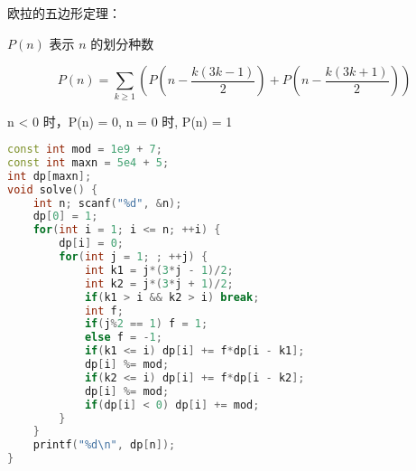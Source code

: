 欧拉的五边形定理：

$P(n)$ 表示 $n$ 的划分种数

$$P(n) = \sum_{k \ge 1} (P(n - \frac{k(3k - 1)}{2}) + P(n - \frac{k(3k + 1)}{2}))$$

n < 0 时，P(n) = 0, n = 0 时, P(n) = 1

\begin{lstlisting}[language=C++]
const int mod = 1e9 + 7;
const int maxn = 5e4 + 5;
int dp[maxn];
void solve() {
    int n; scanf("%d", &n);
    dp[0] = 1;
    for(int i = 1; i <= n; ++i) {
        dp[i] = 0;
        for(int j = 1; ; ++j) {
            int k1 = j*(3*j - 1)/2;
            int k2 = j*(3*j + 1)/2;
            if(k1 > i && k2 > i) break;
            int f;
            if(j%2 == 1) f = 1;
            else f = -1;
            if(k1 <= i) dp[i] += f*dp[i - k1];
            dp[i] %= mod;
            if(k2 <= i) dp[i] += f*dp[i - k2];
            dp[i] %= mod;
            if(dp[i] < 0) dp[i] += mod;
        }
    }
    printf("%d\n", dp[n]);
}
\end{lstlisting}